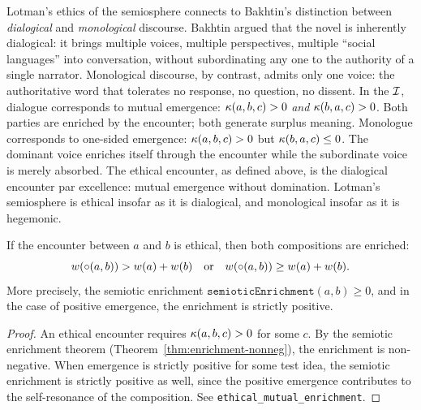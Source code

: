 \begin{remark}
Lotman's ethics of the semiosphere connects to Bakhtin's distinction between \emph{dialogical} and \emph{monological} discourse. Bakhtin argued that the novel is inherently dialogical: it brings multiple voices, multiple perspectives, multiple ``social languages'' into conversation, without subordinating any one to the authority of a single narrator. Monological discourse, by contrast, admits only one voice: the authoritative word that tolerates no response, no question, no dissent. In the $\mathcal{I}$, dialogue corresponds to mutual emergence: $\kappa(a, b, c) > 0$ \emph{and} $\kappa(b, a, c) > 0$. Both parties are enriched by the encounter; both generate surplus meaning. Monologue corresponds to one-sided emergence: $\kappa(a, b, c) > 0$ but $\kappa(b, a, c) \leq 0$. The dominant voice enriches itself through the encounter while the subordinate voice is merely absorbed. The ethical encounter, as defined above, is the dialogical encounter par excellence: mutual emergence without domination. Lotman's semiosphere is ethical insofar as it is dialogical, and monological insofar as it is hegemonic.
\end{remark}

\begin{theorem}
\label{thm:ethical-mutual-enrichment}
If the encounter between $a$ and $b$ is ethical, then both compositions are enriched:
\[
  w(\circ(a, b)) > w(a) + w(b) \quad \text{or} \quad w(\circ(a, b)) \geq w(a) + w(b).
\]
More precisely, the semiotic enrichment $\texttt{semioticEnrichment}(a, b) \geq 0$, and in the case of positive emergence, the enrichment is strictly positive.
\end{theorem}

\begin{proof}
An ethical encounter requires $\kappa(a, b, c) > 0$ for some $c$. By the semiotic enrichment theorem (Theorem~\ref{thm:enrichment-nonneg}), the enrichment is non-negative. When emergence is strictly positive for some test idea, the semiotic enrichment is strictly positive as well, since the positive emergence contributes to the self-resonance of the composition. See \texttt{ethical\_mutual\_enrichment}.
\end{proof}

